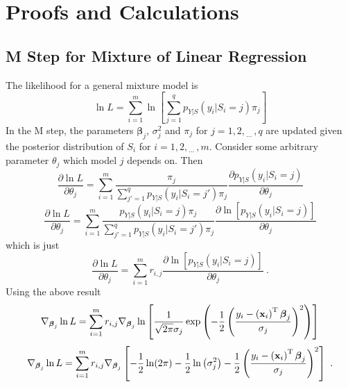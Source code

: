 \documentclass[12pt]{report}
\newcommand{\T}{^\textup{T}}
\newcommand{\dotdotdot}{_{\phantom{.}\cdots}}
\newcommand{\vect}[1]{\mathbf{#1}}
\newcommand{\vectGreek}[1]{\boldsymbol{#1}}
\begin{document}
\chapter{Proofs and Calculations}

\section{M Step for Mixture of Linear Regression} \label{section:Mstep}
The likelihood for a general mixture model is
\begin{equation*}
\ln{L}=\sum_{i=1}^m\ln\left[
\sum_{j=1}^qp_{Y|S}\left(y_i|S_i=j\right)\pi_j
\right]
\end{equation*}
In the M step, the parameters $\vectGreek{\beta}_j$, $\sigma_j^2$ and $\pi_j$ for $j=1,2,\dotdotdot,q$ are updated given the posterior distribution of $S_i$ for $i=1,2,\dotdotdot,m$. Consider some arbitrary parameter $\theta_j$ which model $j$ depends on. Then
\begin{equation*}
\frac{\partial\ln{L}}{\partial\theta_j}=
\sum_{i=1}^m\frac{\pi_j}{\sum_{j'=1}^qp_{Y|S}\left(y_i|S_i=j'\right)\pi_j}
\frac{\partial p_{Y|S}\left(y_i|S_i=j\right)}{\partial\theta_j}
\end{equation*}
\begin{equation*}
\frac{\partial\ln{L}}{\partial\theta_j}=
\sum_{i=1}^m\frac{p_{Y|S}\left(y_i|S_i=j\right)\pi_j}{\sum_{j'=1}^qp_{Y|S}\left(y_i|S_i=j'\right)\pi_j}
\frac{\partial \ln\left[p_{Y|S}\left(y_i|S_i=j\right)\right]}{\partial\theta_j}
\end{equation*}
which is just
\begin{equation}
\frac{\partial\ln{L}}{\partial\theta_j}=
\sum_{i=1}^mr_{i,j}
\frac{\partial \ln\left[p_{Y|S}\left(y_i|S_i=j\right)\right]}{\partial\theta_j} \ .
\end{equation}
Using the above result
\begin{equation*}
\nabla_{\vectGreek{\beta}_j}\ln{L}
=\sum_{i=1}^{m}
r_{i,j}
\nabla_{\vectGreek{\beta}_j}
\ln\left[
	\frac{1}{\sqrt{2\pi}\sigma_j}\exp\left(-\frac{1}{2}\left(\frac{y_i-\left(\vect{x}_i\right)\T\vectGreek{\beta}_j}{\sigma_j}\right)^2\right)
\right]
\end{equation*}
\begin{equation*}
\nabla_{\vectGreek{\beta}_j}\ln{L}
=\sum_{i=1}^{m}
r_{i,j}
\nabla_{\vectGreek{\beta}_j}
\left[
	-\frac{1}{2}\ln(2\pi) - \frac{1}{2}\ln\left(\sigma_j^2\right)-\frac{1}{2}\left(\frac{y_i-\left(\vect{x}_i\right)\T\vectGreek{\beta}_j}{\sigma_j}\right)^2
\right] \ .
\end{equation*}
\end{document}
